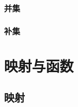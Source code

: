 \subsubsection{并集}
\subsubsection{补集}
\begin{Practice}
  \begin{question}
    \item 
    \item 
    \item 
    \item 
    \item 
    \item 
    \item 
    \item 
    \item 
    \item 
    \item 
    \item 
  \end{question}
\end{Practice}

\begin{Exercise}
  \begin{question}
    \item 
    \item 
    \item 
    \item 
    \item 
    \item 
    \item 
    \item 
    \item 
    \item 
    \item 
    \item 
    \item 
    \item 
    \item 
    \item 
  \end{question}
\end{Exercise}

\section{映射与函数}
\subsection{映射}
\begin{Practice}
  \begin{question}
    \item 
    \item 
    \item 
    \item 
  \end{question}
\end{Practice}
